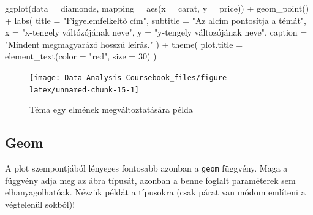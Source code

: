 \documentclass[
]{article}
\newenvironment{Shaded}{\begin{snugshade}}{\end{snugshade}}
\newcommand{\AttributeTok}[1]{\textcolor[rgb]{0.77,0.63,0.00}{#1}}
\newcommand{\DecValTok}[1]{\textcolor[rgb]{0.00,0.00,0.81}{#1}}
\newcommand{\FunctionTok}[1]{\textcolor[rgb]{0.00,0.00,0.00}{#1}}
\newcommand{\NormalTok}[1]{#1}
\newcommand{\SpecialCharTok}[1]{\textcolor[rgb]{0.00,0.00,0.00}{#1}}
\newcommand{\StringTok}[1]{\textcolor[rgb]{0.31,0.60,0.02}{#1}}
\begin{document}
\begin{Shaded}
\begin{Highlighting}[]
\FunctionTok{ggplot}\NormalTok{(}\AttributeTok{data =}\NormalTok{ diamonds, }\AttributeTok{mapping =} \FunctionTok{aes}\NormalTok{(}\AttributeTok{x =}\NormalTok{ carat, }\AttributeTok{y =}\NormalTok{ price)) }\SpecialCharTok{+}
  \FunctionTok{geom\_point}\NormalTok{() }\SpecialCharTok{+}
  \FunctionTok{labs}\NormalTok{(}
    \AttributeTok{title =} \StringTok{"Figyelemfelkeltő cím"}\NormalTok{,}
    \AttributeTok{subtitle =} \StringTok{"Az alcím pontosítja a témát"}\NormalTok{,}
    \AttributeTok{x =} \StringTok{"x{-}tengely váltózójának neve"}\NormalTok{,}
    \AttributeTok{y =} \StringTok{"y{-}tengely változójának neve"}\NormalTok{,}
    \AttributeTok{caption =} \StringTok{"Mindent megmagyarázó hosszú leírás."}
\NormalTok{  ) }\SpecialCharTok{+} 
  \FunctionTok{theme}\NormalTok{(}
    \AttributeTok{plot.title =} \FunctionTok{element\_text}\NormalTok{(}\AttributeTok{color =} \StringTok{"red"}\NormalTok{, }\AttributeTok{size =} \DecValTok{30}\NormalTok{)}
\NormalTok{  )}
\end{Highlighting}
\end{Shaded}

\begin{figure}

{\centering \texttt{[image: Data-Analysis-Coursebook\_files/figure-latex/unnamed-chunk-15-1]} 

}

\caption{Téma egy elmének megváltoztatására példa}\label{fig:unnamed-chunk-15}
\end{figure}

\hypertarget{geom}{%
\subsection{Geom}\label{geom}}

A plot szempontjából lényeges fontosabb azonban a \texttt{geom} függvény. Maga a függvény adja meg az ábra típusát, azonban a benne foglalt paraméterek sem elhanyagolhatóak. Nézzük példát a típusokra (csak párat van módom említeni a végtelenül sokból)!
\end{document}
